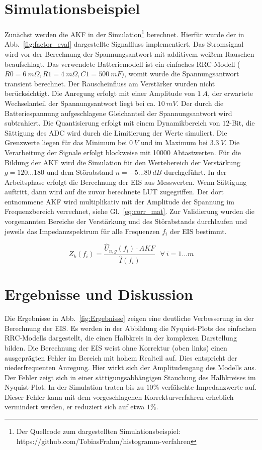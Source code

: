 \smallskip
\section{Simulationsbeispiel}
Zunächst werden die AKF in der Simulation\footnote[2]{Der Quellcode zum dargestellten Simulationsbeispiel: https://github.com/TobiasFrahm/histogramm-verfahren} berechnet. Hierfür wurde der in Abb.~\ref{fig:factor_eval} dargestellte Signalfluss implementiert. Das Stromsignal wird vor der Berechnung der Spannungsantwort mit additivem weißem Rauschen beaufschlagt. Das verwendete Batteriemodell ist ein einfaches RRC-Modell ($R0 = \SI{6}{m\Omega}, R1=\SI{4}{m\Omega}, C1=\SI{500}{mF}$), womit wurde die Spannungsantwort transient berechnet. Der Rauscheinfluss am Verstärker wurden nicht berücksichtigt. Die Anregung erfolgt mit einer Amplitude von $\SI{1}{A}$, der erwartete Wechselanteil der Spannungsantwort liegt bei ca. $\SI{10}{mV}$. Der durch die Batteriespannung aufgeschlagene Gleichanteil der Spannungsantwort wird subtrahiert. Die Quantisierung erfolgt mit einem Dynamikbereich von $12$-Bit, die Sättigung des ADC wird durch die Limitierung der Werte simuliert. Die Grenzwerte liegen für das Minimum bei $\SI{0}{V}$ und im Maximum bei $\SI{3.3}{V}$. Die Verarbeitung der Signale erfolgt blockweise mit 10000 Abtastwerten. Für die Bildung der AKF wird die Simulation für den Wertebereich der Verstärkung $g = 120 ... 180$ und dem Störabstand $n = -5 ... \SI{80}{dB}$ durchgeführt. In der Arbeitsphase erfolgt die Berechnung der EIS aus Messwerten. Wenn Sättigung auftritt, dann wird auf die zuvor berechnete LUT zugegriffen. Der dort entnommene AKF wird multiplikativ mit der Amplitude der Spannung im Frequenzbereich verrechnet, siehe Gl.~\eqref{eq:corr_mat}. Zur Validierung wurden die vorgenannten Bereiche der Verstärkung und des Störabstands durchlaufen und jeweils das Impedanzspektrum für alle Frequenzen $f_i$ der EIS bestimmt.

\begin{equation}
	\label{eq:corr_mat}
	Z_k(f_i) = \frac{\hat{U}_{n,g}(f_i) \cdot AKF}{\hat{I}(f_i)}~~~\forall~i = 1...m
\end{equation}	


\section{Ergebnisse und Diskussion}
Die Ergebnisse in Abb.~\ref{fig:Ergebnisse} zeigen eine deutliche Verbesserung in der Berechnung der EIS. Es werden in der Abbildung die Nyquist-Plots des einfachen RRC-Modells dargestellt, die einen Halbkreis in der komplexen Darstellung bilden. 
Die Berechnung der EIS weist ohne Korrektur (oben links) einen ausgeprägten Fehler im Bereich mit hohem Realteil auf. Dies entspricht der niederfrequenten Anregung. Hier wirkt sich der Amplitudengang des Modells aus. Der Fehler zeigt sich in einer sättigungsabhängigen Stauchung des Halbkreises im Nyquist-Plot. In der Simulation traten bis zu $10\%$ verfälschte Impedanzwerte auf. Dieser Fehler kann mit dem vorgeschlagenen Korrekturverfahren erheblich vermindert werden, er reduziert sich auf etwa $1\%$. 

